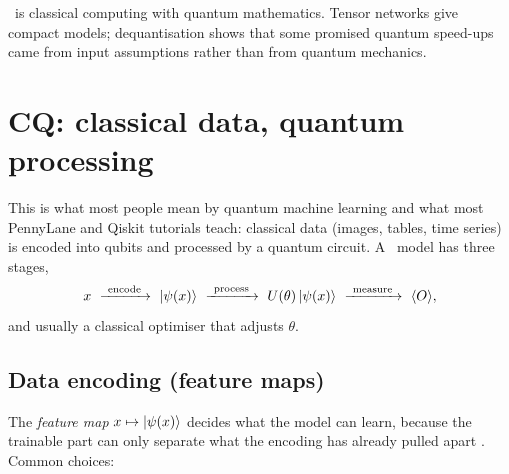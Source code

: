 \documentclass[11pt,a4paper]{article}
\begin{document}
\begin{inshort}
\CC\ is classical computing with quantum mathematics. Tensor networks give compact models;
dequantisation shows that some promised quantum speed-ups came from input assumptions rather than
from quantum mechanics.
\end{inshort}

\section{CQ: classical data, quantum processing}
\label{sec:cq}

This is what most people mean by quantum machine learning and what most PennyLane and Qiskit
tutorials teach: classical data (images, tables, time series) is encoded into qubits and processed
by a quantum circuit. A \CQ\ model has three stages,
\[
  x\ \xrightarrow{\ \text{encode}\ }\ \ket{\psi(x)}\ \xrightarrow{\ \text{process}\ }\
  U(\theta)\ket{\psi(x)}\ \xrightarrow{\ \text{measure}\ }\ \langle O\rangle ,
\]
and usually a classical optimiser that adjusts $\theta$.

\subsection{Data encoding (feature maps)}
\label{sec:encoding}
The \emph{feature map} $x\mapsto\ket{\psi(x)}$ decides what the model can learn, because the
trainable part can only separate what the encoding has already pulled apart \citep{schuld2019feature}.
Common choices:
\end{document}
